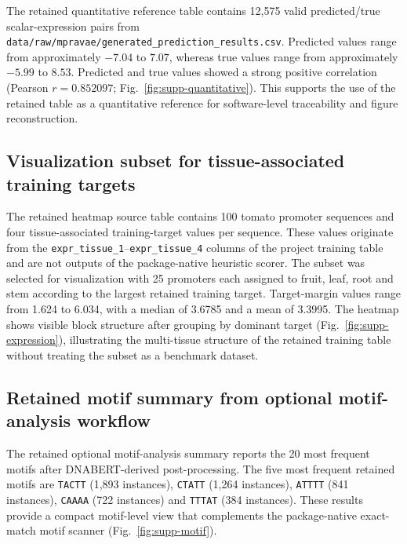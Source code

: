 \documentclass[10pt]{article}
\begin{document}
The retained quantitative reference table contains 12,575 valid predicted/true scalar-expression pairs from \texttt{data/raw/mpravae/generated\_prediction\_results.csv}. Predicted values range from approximately \(-7.04\) to \(7.07\), whereas true values range from approximately \(-5.99\) to \(8.53\). Predicted and true values showed a strong positive correlation (Pearson \(r = 0.852097\); Fig.~\ref{fig:supp-quantitative}). This supports the use of the retained table as a quantitative reference for software-level traceability and figure reconstruction.

\subsection{Visualization subset for tissue-associated training targets}

The retained heatmap source table contains 100 tomato promoter sequences and four tissue-associated training-target values per sequence. These values originate from the \texttt{expr\_tissue\_1}--\texttt{expr\_tissue\_4} columns of the project training table and are not outputs of the package-native heuristic scorer. The subset was selected for visualization with 25 promoters each assigned to fruit, leaf, root and stem according to the largest retained training target. Target-margin values range from 1.624 to 6.034, with a median of 3.6785 and a mean of 3.3995. The heatmap shows visible block structure after grouping by dominant target (Fig.~\ref{fig:supp-expression}), illustrating the multi-tissue structure of the retained training table without treating the subset as a benchmark dataset.

\subsection{Retained motif summary from optional motif-analysis workflow}

The retained optional motif-analysis summary reports the 20 most frequent motifs after DNABERT-derived post-processing. The five most frequent retained motifs are \texttt{TACTT} (1,893 instances), \texttt{CTATT} (1,264 instances), \texttt{ATTTT} (841 instances), \texttt{CAAAA} (722 instances) and \texttt{TTTAT} (384 instances). These results provide a compact motif-level view that complements the package-native exact-match motif scanner (Fig.~\ref{fig:supp-motif}).
\end{document}
